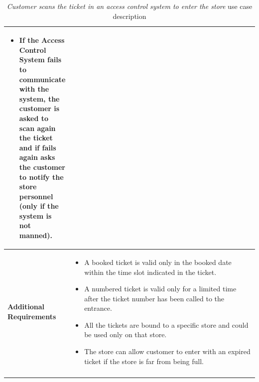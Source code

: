 \begin{longtable}{p{0.25\linewidth}p{0.75\linewidth}}
\begin{itemize}
        \item If the Access Control System fails to communicate with the system, the customer is asked to scan again the ticket and if fails again asks the customer to notify the store personnel (only if the system is not manned).
    \end{itemize}                                                                                                      \\
    \bottomrule
    \textbf{Additional \linebreak Requirements} &
    \begin{itemize}
        \item A booked ticket is valid only in the booked date within the time slot indicated in the ticket.
        \item A numbered ticket is valid only for a limited time after the ticket number has been called to the entrance.
        \item All the tickets are bound to a specific store and could be used only on that store.
        \item The store can allow customer to enter with an expired ticket if the store is far from being full.
    \end{itemize}                                                                                                      \\
    \bottomrule
    \caption{\emph{Customer scans the ticket in an access control system to enter the store} use case description}
\end{longtable}

